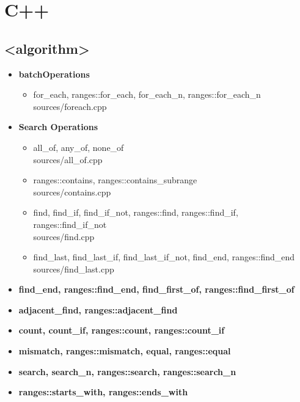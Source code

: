 \documentclass{article}
\begin{document}
\section{C++}
    \subsection{<algorithm>}
      \begin{itemize}
        \item \textbf{batchOperations}
          \begin{itemize}
            \item for\_each, ranges::for\_each, for\_each\_n, ranges::for\_each\_n \\
               {sources/foreach.cpp}
          \end{itemize}
        \item \textbf{Search Operations}
          \begin{itemize}
            \item all\_of, any\_of, none\_of \\
               {sources/all_of.cpp}
            \item ranges::contains, ranges::contains\_subrange \\
               {sources/contains.cpp}
            \item find, find\_if, find\_if\_not, ranges::find, ranges::find\_if, ranges::find\_if\_not \\
               {sources/find.cpp}
            \item find\_last, find\_last\_if, find\_last\_if\_not, find\_end, ranges::find\_end \\
               {sources/find_last.cpp}
          \end{itemize}
        \item \textbf{find\_end, ranges::find\_end, find\_first\_of, ranges::find\_first\_of}
        \item \textbf{adjacent\_find, ranges::adjacent\_find}
        \item \textbf{count, count\_if, ranges::count, ranges::count\_if}
        \item \textbf{mismatch, ranges::mismatch, equal, ranges::equal}
        \item \textbf{search, search\_n, ranges::search, ranges::search\_n}
        \item \textbf{ranges::starts\_with, ranges::ends\_with}

\end{itemize}
\end{document}
